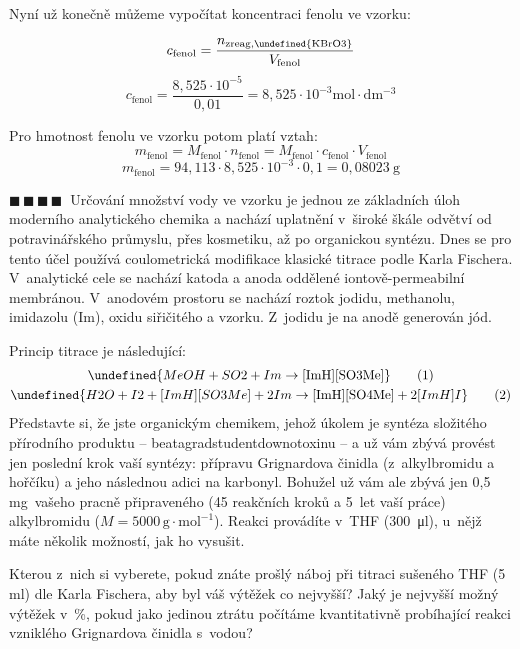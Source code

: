 \documentclass{book}
\let\ch\undefined
\newcommand{\ctyri}{$\blacksquare \, \blacksquare \, \blacksquare \, \blacksquare \; \; $}
\renewenvironment{quotation}{\par}{\par} %
\begin{document}
Nyní už konečně můžeme vypočítat koncentraci fenolu ve vzorku: 

\[
c_{\mathrm{fenol}}=\frac{n_{\mathrm{zreag,\ch{KBrO3}}}}{V_{\mathrm{fenol}}}
\]
\[
c_{\mathrm{fenol}}=\frac{8,525\cdot10^{-5}}{0,01}=8,525\cdot10^{-3}\mathrm{mol\cdot dm^{-3}}
\]

Pro hmotnost fenolu ve vzorku potom platí vztah:
\[
m_{\mathrm{fenol}}=M_{\mathrm{fenol}}\cdot n_{\mathrm{fenol}}=M_{\mathrm{fenol}}\cdot c_{\mathrm{fenol}}\cdot V_{\mathrm{fenol}}
\]
\[
m_{\mathrm{fenol}}=94,113\cdot8,525\cdot10^{-3}\cdot0,1=0,08023\ \mathrm{g}
\]

\hrulefill %
\begin{quotation}
\ctyri Určování množství vody ve vzorku je jednou ze základních úloh moderního
analytického chemika a nachází uplatnění v~široké škále odvětví od
potravinářského průmyslu, přes kosmetiku, až po organickou syntézu.
Dnes se pro tento účel používá coulometrická modifikace klasické titrace
podle Karla Fischera. V~analytické cele se nachází katoda a anoda
oddělené iontově-permeabilní membránou. V~anodovém prostoru se nachází
roztok jodidu, methanolu, imidazolu (Im), oxidu siřičitého a vzorku.
Z~jodidu je na anodě generován jód.

Princip titrace je následující: 
\begin{gather}
\ch{MeOH + SO2 + Im \rightarrow \mathrm{[ImH]}\mathrm{[SO3Me]}} \tag{1} \label{eq:KF1}\\
\ch{H2O + I2 + [ImH][SO3Me] + 2 Im \rightarrow \mathrm{[ImH]}\mathrm{[SO4Me]} + 2 [ImH]I}\tag{2} \label{eq:KF2}
\end{gather}
Představte si, že jste organickým chemikem, jehož úkolem je syntéza složitého
přírodního produktu -- beat\-agrad\-stu\-dent\-downotoxinu -- a už vám zbývá
provést jen poslední krok vaší syntézy: přípravu Grignardova činidla
(z~alkylbromidu a hořčíku) a jeho následnou adici na karbonyl. Bohužel
už vám ale zbývá jen 0,5 mg~vašeho pracně připraveného (45 reakčních
kroků a 5~let vaší práce) alkylbromidu ($M=5000\,\mathrm{g\cdot mol^{-1}}$).
Reakci provádíte v~THF (300~μl), u~nějž máte několik možností, jak
ho vysušit.

Kterou z~nich si vyberete, pokud znáte prošlý náboj při titraci sušeného
THF (5 ml) dle Karla Fischera, aby byl váš výtěžek co nejvyšší? Jaký je nejvyšší
možný výtěžek v~\%, pokud jako jedinou ztrátu počítáme kvantitativně
probíhající reakci vzniklého Grignardova činidla s~vodou?


\end{quotation}
\end{document}
